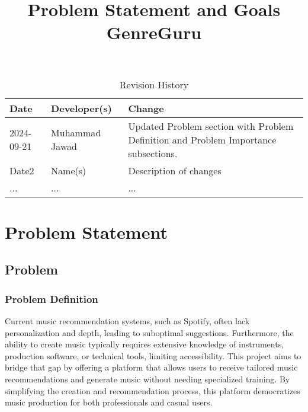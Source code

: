 \documentclass{article}
\title{Problem Statement and Goals\\ GenreGuru}
\author{\authname}
\date{}
\begin{document}
\maketitle

\begin{table}[hp]
\caption{Revision History} \label{TblRevisionHistory}
\begin{tabularx}{\textwidth}{llX}
\toprule
\textbf{Date} & \textbf{Developer(s)} & \textbf{Change}\\
\midrule
2024-09-21 & Muhammad Jawad & Updated Problem section with Problem Definition and Problem Importance subsections.\\
Date2 & Name(s) & Description of changes\\
... & ... & ...\\
\bottomrule
\end{tabularx}
\end{table}

\section{Problem Statement}



\subsection{Problem}

\subsubsection{Problem Definition}

Current music recommendation systems, such as Spotify, often lack personalization and depth, leading to suboptimal suggestions. Furthermore, the ability to create music typically requires extensive knowledge of instruments, production software, or technical tools, limiting accessibility. This project aims to bridge that gap by offering a platform that allows users to receive tailored music recommendations and generate music without needing specialized training. By simplifying the creation and recommendation process, this platform democratizes music production for both professionals and casual users.
\end{document}
